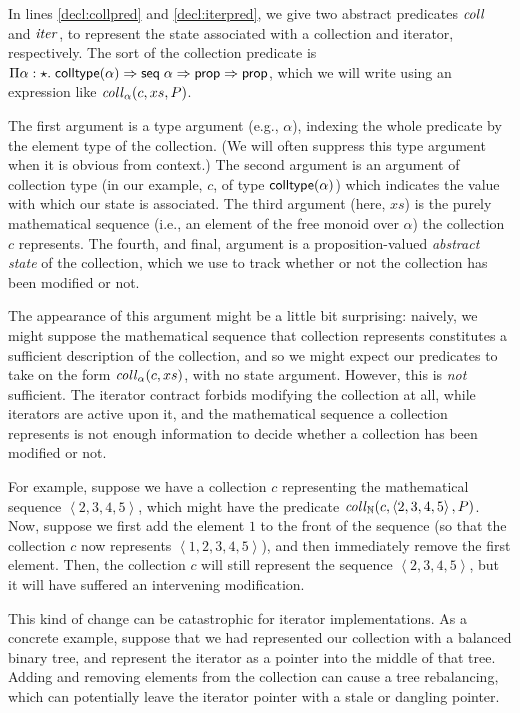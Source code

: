 In lines \ref{decl:collpred} and \ref{decl:iterpred}, we give two
abstract predicates $\mathit{coll}$ and $\mathit{iter}$, to represent the
state associated with a collection and iterator, respectively. The
sort of the collection predicate is $\Pi \alpha:\star.\;
\mathsf{colltype}(\alpha) \Rightarrow \mathsf{seq}\;{\alpha} \Rightarrow \mathsf{prop} \Rightarrow \mathsf{prop}$, which
we will write using an expression like $\mathit{coll}_\alpha(c, xs, P)$.

The first argument is a type argument (e.g., $\alpha$), indexing the
whole predicate by the element type of the collection. (We will often
suppress this type argument when it is obvious from context.) The
second argument is an argument of collection type (in our example,
$c$, of type $\mathsf{colltype}(\alpha)$) which indicates the value with which
our state is associated. The third argument (here, $xs$) is the purely
mathematical sequence (i.e., an element of the free monoid over
$\alpha$) the collection $c$ represents.  The fourth, and final,
argument is a proposition-valued \emph{abstract state} of the
collection, which we use to track whether or not the collection has
been modified or not.

The appearance of this argument might be a little bit surprising:
naively, we might suppose the mathematical sequence that collection
represents constitutes a sufficient description of the collection, and
so we might expect our predicates to take on the form
$\mathit{coll}_\alpha(c, xs)$, with no state argument. However, this is
\emph{not} sufficient. The iterator contract forbids modifying the
collection at all, while iterators are active upon it, and the
mathematical sequence a collection represents is not enough
information to decide whether a collection has been modified or not.

For example, suppose we have a collection $c$ representing the
mathematical sequence $\left<2, 3, 4, 5\right>$, which might have the
predicate $\mathit{coll}_{\mathbb{N}}(c, \left<2, 3, 4, 5\right>, P)$.  Now, suppose
we first add the element $1$ to the front of the sequence (so that the
collection $c$ now represents $\left<1, 2, 3, 4, 5\right>$), and then
immediately remove the first element. Then, the collection $c$ will
still represent the sequence $\left<2, 3, 4, 5\right>$, but it will
have suffered an intervening modification.

This kind of change can be catastrophic for iterator implementations.
As a concrete example, suppose that we had represented our collection
with a balanced binary tree, and represent the iterator as a pointer
into the middle of that tree. Adding and removing elements from the
collection can cause a tree rebalancing, which can potentially leave
the iterator pointer with a stale or dangling pointer.

